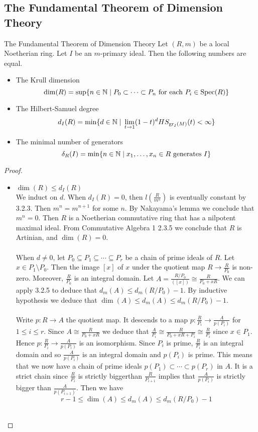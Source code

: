 \documentclass[a4paper]{article}
\begin{document}
\subsection{The Fundamental Theorem of Dimension Theory}
\begin{thm}{The Fundamental Theorem of Dimension Theory}{} Let $(R,m)$ be a local Noetherian ring. Let $I$ be an $m$-primary ideal. Then the following numbers are equal. 
\begin{itemize}
\item The Krull dimension $$\dim(R)=\sup\{n\in\mathbb{N}\;|\;P_0\subset\cdots\subset P_n\text{ for each }P_i\in\text{Spec}(R)\}$$
\item The Hilbert-Samuel degree $$d_I(R)=\min\{d\in\mathbb{N}\;|\;\lim_{t\to 1}(1-t)^dHS_{\text{gr}_I(M)}(t)<\infty\}$$
\item The minimal number of generators $$\delta_R(I)=\min\{n\in\mathbb{N}\;|\;x_1,\dots,x_n\in R\text{ generates }I\}$$
\end{itemize} \tcbline
\begin{proof}~\\
\begin{itemize}
\item $\dim(R)\leq d_I(R)$\\
We induct on $d$. When $d_I(R)=0$, then $l\left(\frac{R}{m^n}\right)$ is eventually constant by 3.2.3. Then $m^n=m^{n+1}$ for some $n$. By Nakayama's lemma we conclude that $m^n=0$. Then $R$ is a Noetherian commutative ring that has a nilpotent maximal ideal. From Commutative Algebra 1 2.3.5 we conclude that $R$ is Artinian, and $\dim(R)=0$. \\~\\

When $d\neq 0$, let $P_0\subseteq P_1\subseteq\cdots\subseteq P_r$ be a chain of prime ideals of $R$. Let $x\in P_1\setminus P_0$. Then the image $[x]$ of $x$ under the quotient map $R\to\frac{R}{P_0}$ is non-zero. Moreover, $\frac{R}{P_0}$ is an integral domain. Let $A=\frac{R/P_0}{([x])}\cong\frac{R}{P_0+xR}$. We can apply 3.2.5 to deduce that $d_m(A)\leq d_m(R/P_0)-1$. By inductive hypothesis we deduce that $\dim(A)\leq d_m(A)\leq d_m(R/P_0)-1$. \\~\\

Write $p:R\to A$ the quotient map. It descends to a map $p:\frac{R}{P_i}\to\frac{A}{p(P_i)}$ for $1\leq i\leq r$. Since $A\cong\frac{R}{P_0+xR}$ we deduce that $\frac{A}{P_i}\cong\frac{R}{P_0+xR+P_i}\cong\frac{R}{P_i}$ since $x\in P_1$. Hence $p:\frac{R}{P_i}\to\frac{A}{p(P_i)}$ is an isomorphism. Since $P_i$ is prime, $\frac{R}{P_i}$ is an integral domain and so $\frac{A}{p(P_i)}$ is an integral domain and $p(P_i)$ is prime. This means that we now have a chain of prime ideals $p(P_1)\subset\cdots\subset p(P_r)$ in $A$. It is a strict chain since $\frac{R}{P_i}$ is strictly biggerthan $\frac{R}{P_{i+1}}$ implies that $\frac{A}{p(P_i)}$ is strictly bigger than $\frac{A}{p(P_{i+1})}$. Then we have $$r-1\leq\dim(A)\leq d_m(A)\leq d_m(R/P_0)-1$$~\\


\end{itemize}
\end{proof}
\end{thm}
\end{document}
